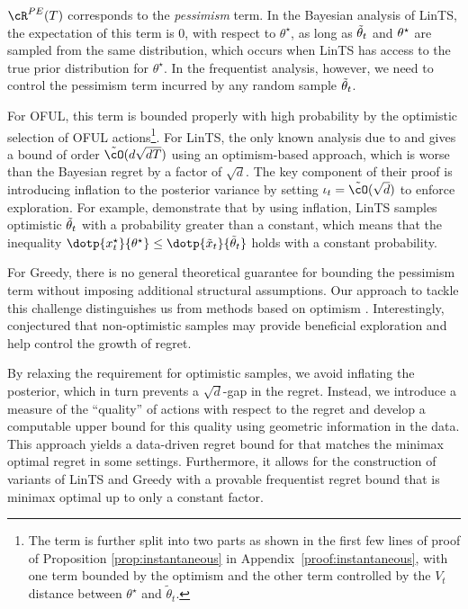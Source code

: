 $\cR^{PE}(T)$ corresponds to the \emph{pessimism} term. In the Bayesian analysis of LinTS, the expectation of this term is $0$, with respect to $\theta^\star$, as long as $\tilde{\theta}_t$ and $\theta^\star$ are sampled from the same distribution, which occurs when LinTS has access to the true prior distribution for $\theta^\star$. In the frequentist analysis, however, we need to control the pessimism term incurred by any random sample $\tilde{\theta}_t$.

For OFUL, this term is bounded properly with high probability by the optimistic selection of OFUL actions\footnote{The term is further split into two parts as shown in the first few lines of proof of Proposition \ref{prop:instantaneous} in Appendix~\ref{proof:instantaneous}, with one term bounded by the optimism and the other term controlled by the $V_t$ distance between $\theta^{\star}$ and $\tilde{\theta}_t$.}. For LinTS, the only known analysis due to \cite{agrawal2013thompson} and \cite{abeille2017linear} gives a bound of order $\tilde{\cO}(d\sqrt{dT})$ using an optimism-based approach, which is worse than the Bayesian regret by a factor of $\sqrt{d}$. The key component of their proof is introducing inflation to the posterior variance by setting $\iota_t =\tilde{\cO}(\sqrt{d})$ to enforce exploration. For example, \cite{abeille2017linear} demonstrate that by using inflation, LinTS samples optimistic $\tilde{\theta}_t$ with a probability greater than a constant, which means that the inequality $\dotp{x_t^\star}{ \theta^{\star}}\leq \dotp{\tilde{x}_t}{\tilde{\theta}_t}$ holds with a constant probability.

For Greedy, there is no general theoretical guarantee for bounding the pessimism term without imposing additional structural assumptions. Our approach to tackle this challenge distinguishes us from methods based on optimism \citep{agrawal2013thompson,abeille2017linear}. Interestingly, \cite{abeille2017linear} conjectured that non-optimistic samples may provide beneficial exploration and help control the growth of regret.

By relaxing the requirement for optimistic samples, we avoid inflating the posterior, which in turn prevents a $\sqrt{d}$-gap in the regret. Instead, we introduce a measure of the ``quality'' of \POFUL{} actions with respect to the regret and develop a computable upper bound for this quality using geometric information in the data. This approach yields a data-driven regret bound for \POFUL{} that matches the minimax optimal regret in some settings. Furthermore, it allows for the construction of variants of LinTS and Greedy with a provable frequentist regret bound that is minimax optimal up to only a constant factor.

